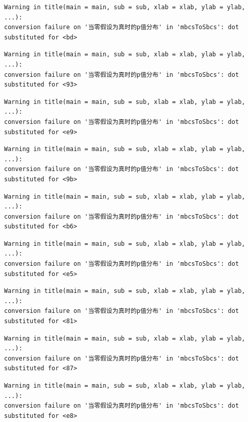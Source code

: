 \documentclass[
  letterpaper,
  DIV=11,
  numbers=noendperiod]{scrreprt}
\begin{document}
\begin{verbatim}
Warning in title(main = main, sub = sub, xlab = xlab, ylab = ylab, ...):
conversion failure on '当零假设为真时的p值分布' in 'mbcsToSbcs': dot
substituted for <bd>
\end{verbatim}

\begin{verbatim}
Warning in title(main = main, sub = sub, xlab = xlab, ylab = ylab, ...):
conversion failure on '当零假设为真时的p值分布' in 'mbcsToSbcs': dot
substituted for <93>
\end{verbatim}

\begin{verbatim}
Warning in title(main = main, sub = sub, xlab = xlab, ylab = ylab, ...):
conversion failure on '当零假设为真时的p值分布' in 'mbcsToSbcs': dot
substituted for <e9>
\end{verbatim}

\begin{verbatim}
Warning in title(main = main, sub = sub, xlab = xlab, ylab = ylab, ...):
conversion failure on '当零假设为真时的p值分布' in 'mbcsToSbcs': dot
substituted for <9b>
\end{verbatim}

\begin{verbatim}
Warning in title(main = main, sub = sub, xlab = xlab, ylab = ylab, ...):
conversion failure on '当零假设为真时的p值分布' in 'mbcsToSbcs': dot
substituted for <b6>
\end{verbatim}

\begin{verbatim}
Warning in title(main = main, sub = sub, xlab = xlab, ylab = ylab, ...):
conversion failure on '当零假设为真时的p值分布' in 'mbcsToSbcs': dot
substituted for <e5>
\end{verbatim}

\begin{verbatim}
Warning in title(main = main, sub = sub, xlab = xlab, ylab = ylab, ...):
conversion failure on '当零假设为真时的p值分布' in 'mbcsToSbcs': dot
substituted for <81>
\end{verbatim}

\begin{verbatim}
Warning in title(main = main, sub = sub, xlab = xlab, ylab = ylab, ...):
conversion failure on '当零假设为真时的p值分布' in 'mbcsToSbcs': dot
substituted for <87>
\end{verbatim}

\begin{verbatim}
Warning in title(main = main, sub = sub, xlab = xlab, ylab = ylab, ...):
conversion failure on '当零假设为真时的p值分布' in 'mbcsToSbcs': dot
substituted for <e8>
\end{verbatim}
\end{document}
